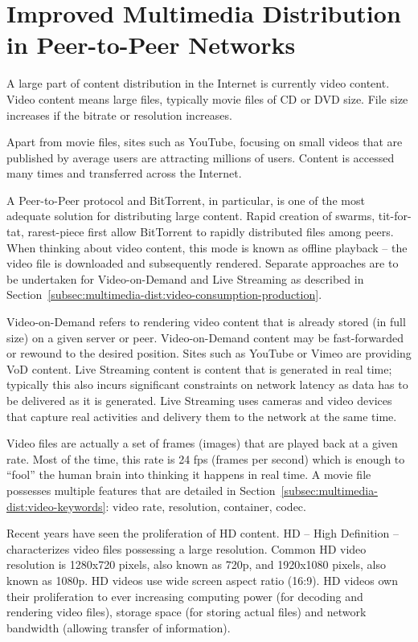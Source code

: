 
\chapter{Improved Multimedia Distribution in Peer-to-Peer Networks}
\label{chapter:multimedia-dist}

A large part of content distribution in the Internet is currently video
content. Video content means large files, typically movie files of CD or DVD
size. File size increases if the bitrate or resolution increases.

Apart from movie files, sites such as YouTube, focusing on small videos that
are published by average users are attracting millions of users. Content is
accessed many times and transferred across the Internet.

A Peer-to-Peer protocol and BitTorrent, in particular, is one of the most
adequate solution for distributing large content. Rapid creation of swarms,
tit-for-tat, rarest-piece first allow BitTorrent to rapidly distributed files
among peers. When thinking about video content, this mode is known as offline
playback -- the video file is downloaded and subsequently rendered. Separate
approaches are to be undertaken for Video-on-Demand and Live Streaming as
described in Section~\ref{subsec:multimedia-dist:video-consumption-production}.

Video-on-Demand refers to rendering video content that is already stored (in
full size) on a given server or peer. Video-on-Demand content may be
fast-forwarded or rewound to the desired position. Sites such as YouTube or
Vimeo are providing VoD content. Live Streaming content is content that is
generated in real time; typically this also incurs significant constraints on
network latency as data has to be delivered as it is generated. Live Streaming
uses cameras and video devices that capture real activities and delivery them
to the network at the same time.

Video files are actually a set of frames (images) that are played back at a
given rate. Most of the time, this rate is 24 fps (frames per second) which is
enough to ``fool'' the human brain into thinking it happens in real time. A
movie file possesses multiple features that are detailed in
Section~\ref{subsec:multimedia-dist:video-keywords}: video rate, resolution, container, codec.

Recent years have seen the proliferation of HD content. HD -- High Definition
-- characterizes video files possessing a large resolution. Common HD video
resolution is 1280x720 pixels, also known as 720p, and 1920x1080 pixels, also
known as 1080p. HD videos use wide screen aspect ratio (16:9). HD videos own
their proliferation to ever increasing computing power (for decoding and
rendering video files), storage space (for storing actual files) and network
bandwidth (allowing transfer of information).

